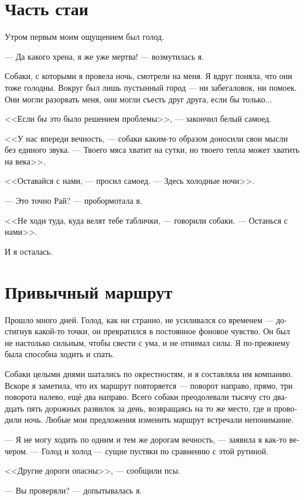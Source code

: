 \documentclass[a4paper,10pt,fleqn]{book}\usepackage{polyglossia}\setdefaultlanguage[babelshorthands=true]{russian}\setotherlanguage{english}\defaultfontfeatures{Ligatures=TeX,Mapping=tex-text}\usepackage{xcolor}\newcommand{\ml}[3]{#2}
\begin{document}
\section{Часть стаи}

Утром первым моим ощущением был голод.

--- Да какого хрена, я же уже мертва! --- возмутилась я.

Собаки, с которыми я провела ночь, смотрели на меня.
Я вдруг поняла, что они тоже голодны.
Вокруг был лишь пустынный город --- ни забегаловок, ни помоек.
Они могли разорвать меня, они могли съесть друг друга, если бы только...

<<Если бы это было решением проблемы>>, --- закончил белый самоед.

<<У нас впереди вечность, --- собаки каким-то образом доносили свои мысли без единого звука.
--- Твоего мяса хватит на сутки, но твоего тепла может хватить на века>>.

<<Оставайся с нами, --- просил самоед.
--- Здесь холодные ночи>>.

--- Это точно Рай? --- пробормотала я.

<<Не ходи туда, куда велят тебе таблички, --- говорили собаки.
--- Останься с нами>>.

И я осталась.

\section{Привычный маршрут}

Прошло много дней.
Голод, как ни странно, не усиливался со временем --- достигнув какой-то точки, он превратился в постоянное фоновое чувство.
Он был не настолько сильным, чтобы свести с ума, и не отнимал силы.
Я по-прежнему была способна ходить и спать.

Собаки целыми днями шатались по окрестностям, и я составляла им компанию.
Вскоре я заметила, что их маршрут повторяется --- поворот направо, прямо, три поворота налево, ещё два направо.
Всего собаки преодолевали тысячу сто двадцать пять дорожных развилок за день, возвращаясь на то же место, где и проводили ночь.
Любые мои предложения изменить маршрут встречали непонимание.

--- Я не могу ходить по одним и тем же дорогам вечность, --- заявила я как-то вечером.
--- Голод и холод --- сущие пустяки по сравнению с этой рутиной.

<<Другие дороги опасны>>, --- сообщили псы.

--- Вы проверяли? --- допытывалась я.
\end{document}
